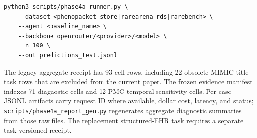 \begin{Verbatim}
python3 scripts/phase4a_runner.py \
    --dataset <phenopacket_store|rarearena_rds|rarebench> \
    --agent <baseline_name> \
    --backbone openrouter/<provider>/<model> \
    --n 100 \
    --out predictions_test.jsonl
\end{Verbatim}

The legacy aggregate receipt has 93 cell rows, including 22 obsolete MIMIC
title-task rows that are excluded from the current paper. The frozen evidence
manifest indexes 71 diagnostic cells and 12 PMC temporal-sensitivity cells.
Per-case JSONL artifacts carry request ID where available, dollar cost,
latency, and status; \texttt{scripts/phase4a\_report\_gen.py} regenerates aggregate
diagnostic summaries from those raw files. The replacement structured-EHR
task requires a separate task-versioned receipt.


